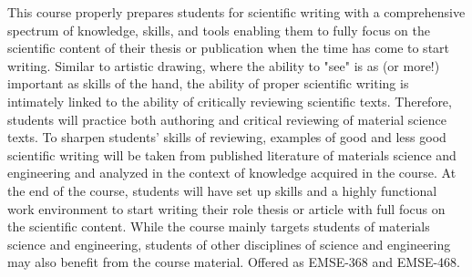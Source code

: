 This course properly prepares students for scientific writing with a comprehensive spectrum of knowledge, skills, and tools enabling them to fully focus on the scientific content of their thesis or publication when the time has come to start writing. Similar to artistic drawing, where the ability to "see" is as (or more!) important as skills of the hand, the ability of proper scientific writing is intimately linked to the ability of critically reviewing scientific texts. Therefore, students will practice both authoring and critical reviewing of material science texts. To sharpen students' skills of reviewing, examples of good and less good scientific writing will be taken from published literature of materials science and engineering and analyzed in the context of knowledge acquired in the course. At the end of the course, students will have set up skills and a highly functional work environment to start writing their role thesis or article with full focus on the scientific content. While the course mainly targets students of materials science and engineering, students of other disciplines of science and engineering may also benefit from the course material. Offered as EMSE-368 and EMSE-468.


% 				
% 



